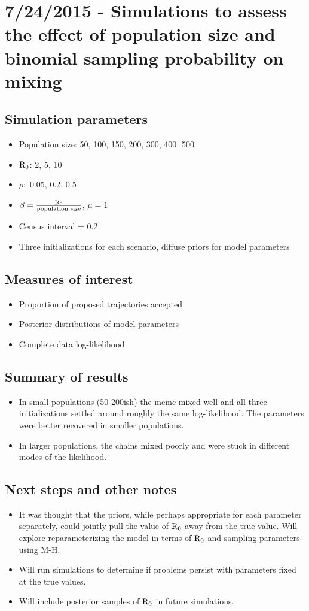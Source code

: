 \section*{7/24/2015 - Simulations to assess the effect of population size and binomial sampling probability on mixing}
\subsection*{Simulation parameters}
\begin{itemize}
	\item Population size: 50, 100, 150, 200, 300, 400, 500
	\item $ \mathrm{R}_0 $: 2, 5, 10
	\item $ \rho: $ 0.05, 0.2, 0.5
	\item $ \beta =\frac{\mathrm{R}_0}{\text{population size}} $, $ \mu = 1 $
	\item Census interval = 0.2
	\item Three initializations for each scenario, diffuse priors for model parameters
\end{itemize}
\subsection*{Measures of interest}
\begin{itemize}
	\item Proportion of proposed trajectories accepted
	\item Posterior distributions of model parameters
	\item Complete data log-likelihood
\end{itemize}
\subsection*{Summary of results}
\begin{itemize}
	\item In small populations (50-200ish) the mcmc mixed well and all three initializations settled around roughly the same log-likelihood. The parameters were better recovered in smaller populations.
	\item In larger populations, the chains mixed poorly and were stuck in different modes of the likelihood. 
\end{itemize}

\subsection*{Next steps and other notes}
\begin{itemize}
	\item It was thought that the priors, while perhaps appropriate for each parameter separately, could jointly pull the value of $ \mathrm{R}_0 $ away from the true value. Will explore reparameterizing the model in terms of $ \mathrm{R}_0 $  and sampling parameters using M-H. 
	\item Will run simulations to determine if problems persist with parameters fixed at the true values. 
	\item Will include posterior samples of $ \mathrm{R}_0 $ in future simulations.  
\end{itemize}
